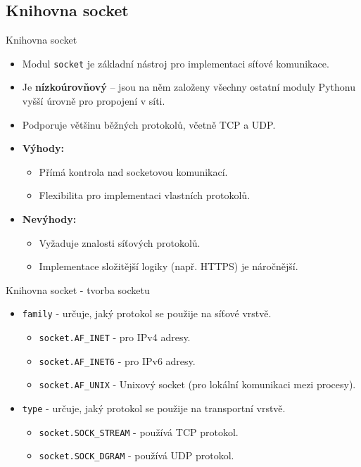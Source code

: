 \documentclass{beamer}
\begin{document}
\subsection{Knihovna socket}
\begin{frame}{Knihovna socket}
	\begin{itemize}
		\item Modul \texttt{socket} je základní nástroj pro implementaci síťové komunikace.
		\item Je \textbf{nízkoúrovňový} – jsou na něm založeny všechny ostatní moduly Pythonu vyšší úrovně pro propojení v síti.
		\item Podporuje většinu běžných protokolů, včetně TCP a UDP.
		\item \textbf{Výhody:}
		\begin{itemize}
			\item Přímá kontrola nad socketovou komunikací.
			\item Flexibilita pro implementaci vlastních protokolů.
		\end{itemize}
		\item \textbf{Nevýhody:}
		\begin{itemize}
			\item Vyžaduje znalosti síťových protokolů.
			\item Implementace složitější logiky (např. HTTPS) je náročnější.
		\end{itemize}
	\end{itemize}
\end{frame}

\begin{frame}{Knihovna socket - tvorba socketu}
	\begin{itemize}
        \begin{semiverbatim}
		import socket

		socket = socket.socket(
			family=AF_INET,
			type=SOCK_STREAM
		)
        \end{semiverbatim}

		\item \texttt{family}  - určuje, jaký protokol se použije na síťové vrstvě.
		\begin{itemize}
			\item \texttt{socket.AF_INET} - pro IPv4 adresy.
			\item \texttt{socket.AF_INET6} - pro IPv6 adresy.
			\item \texttt{socket.AF_UNIX} - Unixový socket (pro lokální komunikaci mezi procesy).
		\end{itemize}
		\item \texttt{type} - určuje, jaký protokol se použije na transportní vrstvě.
		\begin{itemize}
			\item \texttt{socket.SOCK_STREAM} - používá TCP protokol.
			\item \texttt{socket.SOCK_DGRAM} - používá UDP protokol.
		\end{itemize}
	\end{itemize}
\end{frame}
\end{document}
